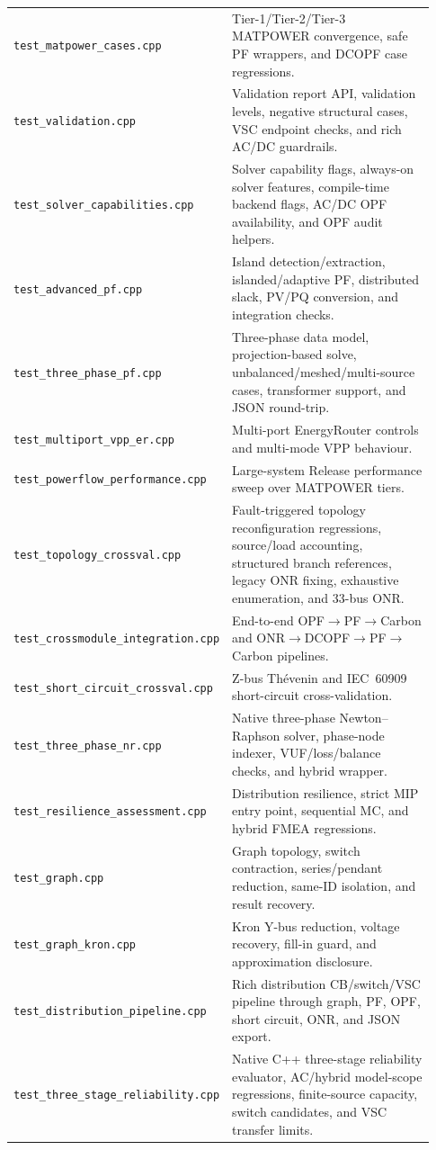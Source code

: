 \begin{longtable}{L{0.34\linewidth}L{0.59\linewidth}}
\texttt{test\_matpower\_cases.cpp} & Tier-1/Tier-2/Tier-3 MATPOWER convergence, safe PF wrappers, and DCOPF case regressions. \\
\texttt{test\_validation.cpp} & Validation report API, validation levels, negative structural cases, VSC endpoint checks, and rich AC/DC guardrails. \\
\texttt{test\_solver\_capabilities.cpp} & Solver capability flags, always-on solver features, compile-time backend flags, AC/DC OPF availability, and OPF audit helpers. \\
\texttt{test\_advanced\_pf.cpp} & Island detection/extraction, islanded/adaptive PF, distributed slack, PV/PQ conversion, and integration checks. \\
\texttt{test\_three\_phase\_pf.cpp} & Three-phase data model, projection-based solve, unbalanced/meshed/multi-source cases, transformer support, and JSON round-trip. \\
\texttt{test\_multiport\_vpp\_er.cpp} & Multi-port EnergyRouter controls and multi-mode VPP behaviour. \\
\texttt{test\_powerflow\_performance.cpp} & Large-system Release performance sweep over MATPOWER tiers. \\
\texttt{test\_topology\_crossval.cpp} & Fault-triggered topology reconfiguration regressions, source/load accounting, structured branch references, legacy ONR fixing, exhaustive enumeration, and 33-bus ONR. \\
\texttt{test\_crossmodule\_integration.cpp} & End-to-end OPF$\rightarrow$PF$\rightarrow$Carbon and ONR$\rightarrow$DCOPF$\rightarrow$PF$\rightarrow$Carbon pipelines. \\
\texttt{test\_short\_circuit\_crossval.cpp} & Z-bus Thévenin and IEC~60909 short-circuit cross-validation. \\
\texttt{test\_three\_phase\_nr.cpp} & Native three-phase Newton--Raphson solver, phase-node indexer, VUF/loss/balance checks, and hybrid wrapper. \\
\texttt{test\_resilience\_assessment.cpp} & Distribution resilience, strict MIP entry point, sequential MC, and hybrid FMEA regressions. \\
\texttt{test\_graph.cpp} & Graph topology, switch contraction, series/pendant reduction, same-ID isolation, and result recovery. \\
\texttt{test\_graph\_kron.cpp} & Kron Y-bus reduction, voltage recovery, fill-in guard, and approximation disclosure. \\
\texttt{test\_distribution\_pipeline.cpp} & Rich distribution CB/switch/VSC pipeline through graph, PF, OPF, short circuit, ONR, and JSON export. \\
\texttt{test\_three\_stage\_reliability.cpp} & Native C++ three-stage reliability evaluator, AC/hybrid model-scope regressions, finite-source capacity, switch candidates, and VSC transfer limits. \\
\bottomrule
\end{longtable}

